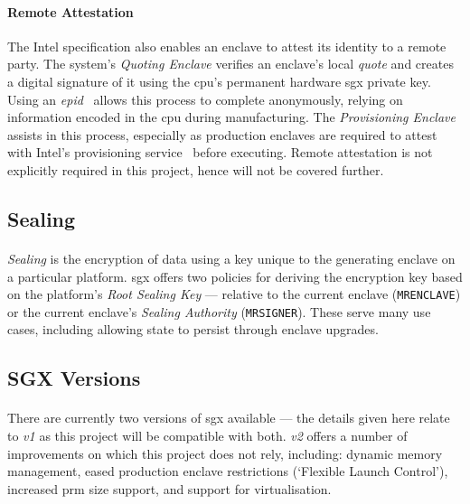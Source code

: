 \paragraph{Remote Attestation} The Intel specification also enables an enclave to attest its identity to a remote party. The system's \textit{Quoting Enclave} verifies an enclave's local \textit{quote} and creates a digital signature of it using the \acrshort{cpu}'s permanent hardware \acrshort{sgx} private key. Using an \textit{\acrfull{epid}}~\cite{epid} allows this process to complete anonymously, relying on information encoded in the \acrshort{cpu} during manufacturing. The \textit{Provisioning Enclave} assists in this process, especially as production enclaves are required to attest with Intel's provisioning service~\cite{sgx-prov-service} before executing. Remote attestation is not explicitly required in this project, hence will not be covered further.

\subsection{Sealing}
\label{sec:sealing}
\paragraph{} \textit{Sealing} is the encryption of data using a key unique to the generating enclave on a particular platform. \acrshort{sgx} offers two policies for deriving the encryption key based on the platform's \textit{Root Sealing Key} --- relative to the current enclave (\texttt{MRENCLAVE}) or the current enclave's \textit{Sealing Authority} (\texttt{MRSIGNER}). These serve many use cases, including allowing state to persist through enclave upgrades.

\subsection{SGX Versions}
\label{sec:sgx-versions}
\paragraph{} There are currently two versions of \acrshort{sgx} available --- the details given here relate to \textit{v1} as this project will be compatible with both. \textit{v2} offers a number of improvements on which this project does not rely, including: dynamic memory management, eased production enclave restrictions (`Flexible Launch Control'), increased \acrshort{prm} size support, and support for virtualisation.


